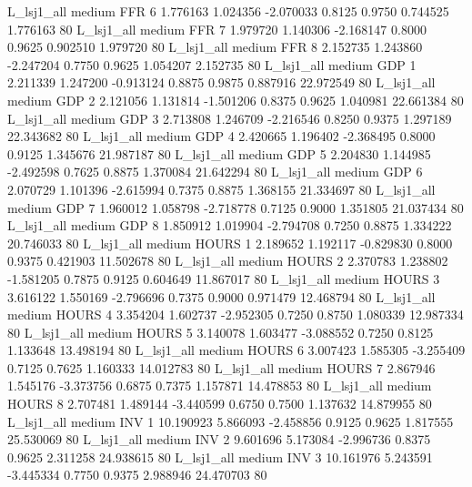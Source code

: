     L_lsj1_all     medium      FFR                 6  1.776163 1.024356 -2.070033 0.8125 0.9750  0.744525    1.776163 80
    L_lsj1_all     medium      FFR                 7  1.979720 1.140306 -2.168147 0.8000 0.9625  0.902510    1.979720 80
    L_lsj1_all     medium      FFR                 8  2.152735 1.243860 -2.247204 0.7750 0.9625  1.054207    2.152735 80
    L_lsj1_all     medium      GDP                 1  2.211339 1.247200 -0.913124 0.8875 0.9875  0.887916   22.972549 80
    L_lsj1_all     medium      GDP                 2  2.121056 1.131814 -1.501206 0.8375 0.9625  1.040981   22.661384 80
    L_lsj1_all     medium      GDP                 3  2.713808 1.246709 -2.216546 0.8250 0.9375  1.297189   22.343682 80
    L_lsj1_all     medium      GDP                 4  2.420665 1.196402 -2.368495 0.8000 0.9125  1.345676   21.987187 80
    L_lsj1_all     medium      GDP                 5  2.204830 1.144985 -2.492598 0.7625 0.8875  1.370084   21.642294 80
    L_lsj1_all     medium      GDP                 6  2.070729 1.101396 -2.615994 0.7375 0.8875  1.368155   21.334697 80
    L_lsj1_all     medium      GDP                 7  1.960012 1.058798 -2.718778 0.7125 0.9000  1.351805   21.037434 80
    L_lsj1_all     medium      GDP                 8  1.850912 1.019904 -2.794708 0.7250 0.8875  1.334222   20.746033 80
    L_lsj1_all     medium    HOURS                 1  2.189652 1.192117 -0.829830 0.8000 0.9375  0.421903   11.502678 80
    L_lsj1_all     medium    HOURS                 2  2.370783 1.238802 -1.581205 0.7875 0.9125  0.604649   11.867017 80
    L_lsj1_all     medium    HOURS                 3  3.616122 1.550169 -2.796696 0.7375 0.9000  0.971479   12.468794 80
    L_lsj1_all     medium    HOURS                 4  3.354204 1.602737 -2.952305 0.7250 0.8750  1.080339   12.987334 80
    L_lsj1_all     medium    HOURS                 5  3.140078 1.603477 -3.088552 0.7250 0.8125  1.133648   13.498194 80
    L_lsj1_all     medium    HOURS                 6  3.007423 1.585305 -3.255409 0.7125 0.7625  1.160333   14.012783 80
    L_lsj1_all     medium    HOURS                 7  2.867946 1.545176 -3.373756 0.6875 0.7375  1.157871   14.478853 80
    L_lsj1_all     medium    HOURS                 8  2.707481 1.489144 -3.440599 0.6750 0.7500  1.137632   14.879955 80
    L_lsj1_all     medium      INV                 1 10.190923 5.866093 -2.458856 0.9125 0.9625  1.817555   25.530069 80
    L_lsj1_all     medium      INV                 2  9.601696 5.173084 -2.996736 0.8375 0.9625  2.311258   24.938615 80
    L_lsj1_all     medium      INV                 3 10.161976 5.243591 -3.445334 0.7750 0.9375  2.988946   24.470703 80
